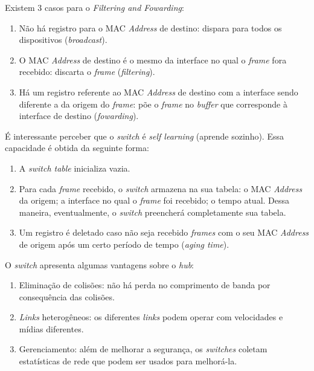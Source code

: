 Existem 3 casos para o \emph{Filtering and Fowarding}:

\begin{enumerate}
\def\labelenumi{\arabic{enumi}.}
\tightlist
\item
  Não há registro para o MAC \emph{Address} de destino: dispara para
  todos os dispositivos (\emph{broadcast}).
\item
  O MAC \emph{Address} de destino é o mesmo da interface no qual o
  \emph{frame} fora recebido: discarta o \emph{frame}
  (\emph{filtering}).
\item
  Há um registro referente ao MAC \emph{Address} de destino com a
  interface sendo diferente a da origem do \emph{frame}: põe o
  \emph{frame} no \emph{buffer} que corresponde à interface de destino
  (\emph{fowarding}).
\end{enumerate}

É interessante perceber que o \emph{switch} é \emph{self learning}
(aprende sozinho). Essa capacidade é obtida da seguinte forma:

\begin{enumerate}
\def\labelenumi{\arabic{enumi}.}
\tightlist
\item
  A \emph{switch table} inicializa vazia.
\item
  Para cada \emph{frame} recebido, o \emph{switch} armazena na sua
  tabela: o MAC \emph{Address} da origem; a interface no qual o
  \emph{frame} foi recebido; o tempo atual. Dessa maneira,
  eventualmente, o \emph{switch} preencherá completamente sua tabela.
\item
  Um registro é deletado caso não seja recebido \emph{frames} com o seu
  MAC \emph{Address} de origem após um certo período de tempo
  (\emph{aging time}).
\end{enumerate}

O \emph{switch} apresenta algumas vantagens sobre o \emph{hub}:

\begin{enumerate}
\def\labelenumi{\arabic{enumi}.}
\tightlist
\item
  Eliminação de colisões: não há perda no comprimento de banda por
  consequência das colisões.
\item
  \emph{Links} heterogêneos: os diferentes \emph{links} podem operar com
  velocidades e mídias diferentes.
\item
  Gerenciamento: além de melhorar a segurança, os \emph{switches}
  coletam estatísticas de rede que podem ser usados para melhorá-la.
\end{enumerate}


